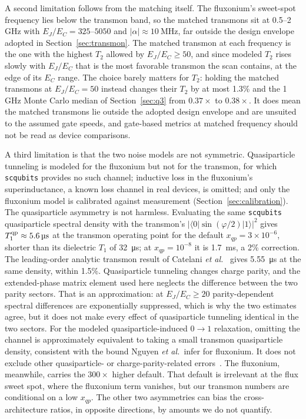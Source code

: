 \documentclass{SciPost}
\begin{document}
A second limitation follows from the matching itself. The fluxonium's sweet-spot frequency lies
below the transmon band, so the matched transmons sit at 0.5--2\,GHz with
$E_J/E_C = 325$--$5050$ and $|\alpha| \approx \SI{10}{\mega\hertz}$, far outside the design
envelope adopted in Section~\ref{sec:transmon}. The matched transmon at each frequency is the one with the highest $T_2$ allowed by
$E_J/E_C\ge50$, and since modeled $T_2$ rises slowly with $E_J/E_C$ that is the most favorable
transmon the scan contains, at the edge of its $E_C$ range. The choice barely matters for $T_2$:
holding the matched transmons at $E_J/E_C=50$ instead changes their $T_2$ by at most 1.3\% and the
1\,GHz Monte Carlo median of Section~\ref{sec:q3} from $0.37\times$ to $0.38\times$. It does mean
the matched transmons lie outside the adopted design envelope and are unsuited to the assumed
gate speeds, and gate-based metrics at matched frequency should not be read as device
comparisons.

A third limitation is that the two noise models are not symmetric. Quasiparticle tunneling is
modeled for the fluxonium but not for the transmon, for which \texttt{scqubits} provides no such
channel; inductive loss in the fluxonium's superinductance, a known loss channel in real devices,
is omitted; and only the fluxonium model is calibrated against measurement
(Section~\ref{sec:calibration}). The quasiparticle asymmetry is not harmless. Evaluating the same
\texttt{scqubits} quasiparticle spectral density with the transmon's
$|\langle 0|\sin(\varphi/2)|1\rangle|^2$ gives $T_1^{\rm qp}\approx\SI{5.6}{\micro\second}$ at the
transmon operating point for the default $x_{qp}=3\times10^{-6}$, shorter than its dielectric
$T_1$ of \SI{32}{\micro\second}; at $x_{qp}=10^{-8}$ it is \SI{1.7}{\milli\second}, a 2\%
correction. The leading-order analytic transmon result of Catelani \emph{et al.}~\cite{catelani2011}
gives \SI{5.55}{\micro\second} at the same density, within 1.5\%. Quasiparticle tunneling changes charge parity, and the extended-phase matrix element used here
neglects the difference between the two parity sectors. That is an approximation: at
$E_J/E_C\ge20$ parity-dependent spectral differences are exponentially suppressed, which is why the
two estimates agree, but it does not make every effect of quasiparticle tunneling identical in the
two sectors. For the modeled quasiparticle-induced $0\to1$ relaxation, omitting the channel is
approximately equivalent to taking a small transmon quasiparticle density, consistent with the
bound Nguyen \emph{et al.}\ infer for fluxonium. It does not exclude other quasiparticle- or
charge-parity-related errors~\cite{papic2024}. The fluxonium, meanwhile, carries the $300\times$ higher default. That default is irrelevant at the flux sweet
spot, where the fluxonium term vanishes, but our transmon numbers are conditional on a low
$x_{qp}$. The other two asymmetries can bias the cross-architecture ratios, in opposite
directions, by amounts we do not quantify.
\end{document}
